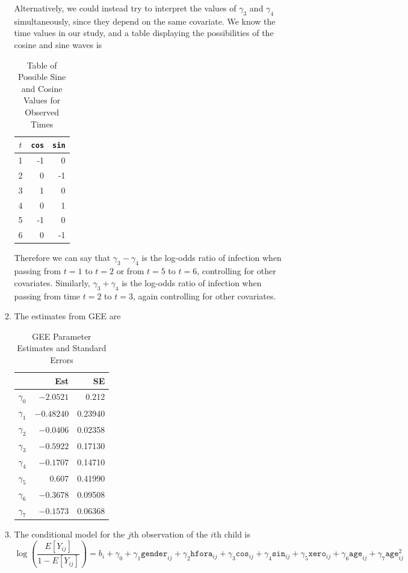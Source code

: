 \documentclass[11pt]{article}
\begin{document}
\begin{enumerate}
\begin{enumerate}
\begin{itemize}
			\end{itemize}
			Alternatively, we could instead try to interpret the values of $\gamma_3$ and $\gamma_4$ simultaneously, since they depend on the same covariate. We know the time values in our study, and a table displaying the possibilities of the cosine and sine waves is
			\begin{table}[H]
			\centering
				\begin{tabular}{c|r|r}
					$t$ & \texttt{cos} & \texttt{sin} \\
					\hline
					1 & -1 & 0 \\
					2 & 0 & -1 \\
					3 & 1 & 0 \\
					4 & 0 & 1 \\
					5 & -1 & 0 \\
					6 & 0 & -1
				\end{tabular}
				\caption{Table of Possible Sine and Cosine Values for Observed Times}
			\end{table}
			Therefore we can say that $\gamma_3-\gamma_4$ is the log-odds ratio of infection when passing from $t=1$ to $t=2$ or from $t=5$ to $t=6$, controlling for other covariates. Similarly, $\gamma_3 + \gamma_4$ is the log-odds ratio of infection when passing from time $t=2$ to $t=3$, again controlling for other covariates. 
			\item The estimates from GEE are
			\begin{table}[H]
			\centering
				\begin{tabular}{l | r | r}
					& Est & SE \\
					\hline
				$\gamma_0$ & $-2.0521$ & 0.212 \\
				$\gamma_1$ & $-0.48240$ & 0.23940 \\
				$\gamma_2$ & $-0.0406$ & 0.02358\\
				$\gamma_3$ & $-0.5922$ & 0.17130\\
				$\gamma_4$ & $-0.1707$ & 0.14710\\
				$\gamma_5$ & $0.607$ & 0.41990\\
				$\gamma_6$ & $-0.3678$ & 0.09508\\
				$\gamma_7$ & $-0.1573$ & 0.06368\\
				\end{tabular}
				\caption{GEE Parameter Estimates and Standard Errors}
			\end{table}
			\item The conditional model for the $j$th observation of the $i$th child is
			\[
				\log\left(\frac{E[Y_{ij}]}{1-E[Y_{ij}]} \right) = b_i + \gamma_0 + \gamma_1\texttt{gender}_{ij} + \gamma_2\texttt{hfora}_{ij} + \gamma_3\texttt{cos}_{ij} + \gamma_4\texttt{sin}_{ij} + \gamma_5\texttt{xero}_{ij} + \gamma_6\texttt{age}_{ij} + \gamma_7\texttt{age}^2_{ij}
\]
\end{enumerate}
\end{enumerate}
\end{document}
